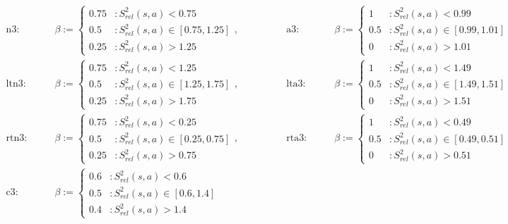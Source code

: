 \documentclass{article}
\theoremstyle{plain}
\theoremstyle{definition}
\theoremstyle{remark}
\begin{document}
\begin{align*}
    \text{n3:} \quad\quad 
    &\beta:= 
    \begin{cases}
    0.75&: S^2_{rel}(s,a) < 0.75 \\
    0.5&: S^2_{rel}(s,a)\in[0.75,1.25] \\
    0.25&: S^2_{rel}(s,a) > 1.25
    \end{cases}, \quad\quad\quad\quad
    &\text{a3:} \quad\quad
    &\beta:= 
    \begin{cases}
    1&: S^2_{rel}(s,a) < 0.99 \\
    0.5&: S^2_{rel}(s,a)\in[0.99,1.01] \\
    0&: S^2_{rel}(s,a) > 1.01
    \end{cases}\\
    \text{ltn3:} \quad\quad 
    &\beta:= 
    \begin{cases}
    0.75&: S^2_{rel}(s,a) < 1.25 \\
    0.5&: S^2_{rel}(s,a)\in[1.25,1.75] \\
    0.25&: S^2_{rel}(s,a) > 1.75
    \end{cases} , \quad\quad\quad\quad
    &\text{lta3:} \quad\quad 
    &\beta:= 
    \begin{cases}
    1&: S^2_{rel}(s,a) < 1.49 \\
    0.5&: S^2_{rel}(s,a)\in[1.49,1.51] \\
    0&: S^2_{rel}(s,a) > 1.51
    \end{cases}\\
    \text{rtn3:} \quad\quad 
    &\beta:= 
    \begin{cases}
    0.75&: S^2_{rel}(s,a) < 0.25 \\
    0.5&: S^2_{rel}(s,a)\in[0.25,0.75] \\
    0.25&: S^2_{rel}(s,a) > 0.75
    \end{cases}, \quad\quad\quad\quad
    &\text{rta3:} \quad\quad 
    &\beta:= 
    \begin{cases}
    1&: S^2_{rel}(s,a) < 0.49 \\
    0.5&: S^2_{rel}(s,a)\in[0.49,0.51] \\
    0&: S^2_{rel}(s,a) > 0.51
    \end{cases}\\
    \text{c3:} \quad\quad 
    &\beta:= 
    \begin{cases}
    0.6&: S^2_{rel}(s,a) < 0.6 \\
    0.5&: S^2_{rel}(s,a)\in[0.6,1.4] \\
    0.4&: S^2_{rel}(s,a) > 1.4

\end{cases}
\end{align*}
\end{document}
